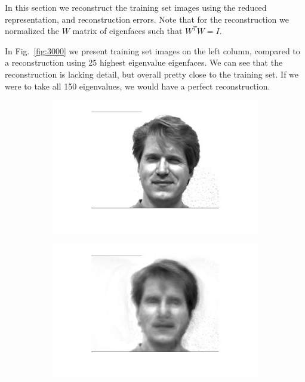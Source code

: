 \documentclass[a4paper]{iacas}
\begin{document}
In this section we reconstruct the training set images using the reduced representation, and reconstruction errors. Note that for the reconstruction we normalized the $W$ matrix of eigenfaces such that $W^TW = I$.

In Fig.~\ref{fig:3000} we present training set images on the left column, compared to a reconstruction using 25 highest eigenvalue eigenfaces. We can see that the reconstruction is lacking detail, but overall pretty close to the training set. If we were to take all 150 eigenvalues, we would have a perfect reconstruction.

\begin{figure}[!htbp]
	\centering
	\begin{subfigure}[b]{0.4\textwidth}
		\includegraphics[width=\textwidth]{3102.jpg}
		\caption{}
		\label{fig:3102}
	\end{subfigure}
	\begin{subfigure}[b]{0.4\textwidth}
		\includegraphics[width=\textwidth]{3101.jpg}
		\caption{}
		\label{fig:3101}
	\end{subfigure}
	

\end{figure}
\end{document}

